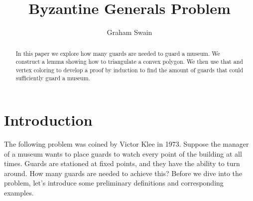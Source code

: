 \documentclass[10pt]{amsart}
\begin{document}
\parskip10pt
\parindent12pt
\baselineskip16pt


\def\G{\widetilde{G}}
\def\B{\widetilde{B}}
\def\T{\widetilde{T}}
\def\C{\mathbb{C}}
\def\A{\mathbb{A}}
\def\Z{\mathbb{Z}}
\def\R{\mathbb{R}}
\def\Q{\mathbb{Q}}
\def\N{\mathbb{N}}
\def\C{\mathbb{C}}
\def\F{\mathbb{F}}
\def\I{\mathbb{I}}
\def\H{\mathcal{H}}
\def\e{\varepsilon}
\def\s{\underline s}
\def\z{\zeta }
\def\vp{\varpi }
\def\O{\mathcal O}
\def\v{\upsilon }
\def\U{\Upsilon }
\def\p{\wp }
\def\p{\mathfrak{p}}
\def\B{\mathfrak{B}}

\newtheorem{theorem}{Theorem}%
\newtheorem{lemma}[theorem]{Lemma}


\title{Byzantine Generals Problem}

\author{Graham Swain}

\begin{abstract}
    In this paper we explore how many guards are needed to guard a museum. We construct a lemma 
    showing how to triangulate a convex polygon. We then use that and vertex coloring to develop 
    a proof by induction to find the amount of guards that could sufficiently guard a museum.
\end{abstract}

\maketitle


\section{Introduction}
The following problem was coined by Victor Klee in 1973. 
Suppose the manager of a museum wants to place guards to watch every point of the building at all times. 
Guards are stationed at fixed points, and they have the ability to turn around. 
How many guards are needed to achieve this? Before we dive into the problem, let's introduce some preliminary definitions and corresponding examples.
\end{document}
